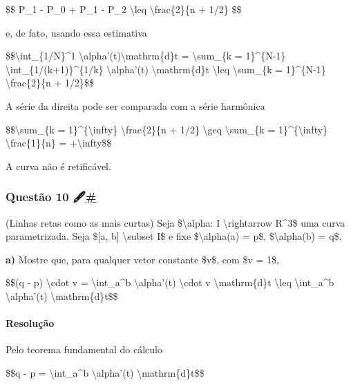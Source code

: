 \$\$ \textbar{}P\_1 - P\_0\textbar{} + \textbar{}P\_1 - P\_2\textbar{}
\textbackslash{}leq \textbackslash{}frac\{2\}\{n + 1/2\} \$\$

e, de fato, usando essa estimativa

\$\$\textbackslash{}int\_\{1/N\}\^{}1
\textbar{}\textbackslash{}alpha'(t)\textbar{}\textbackslash{}mathrm\{d\}t
= \textbackslash{}sum\_\{k = 1\}\^{}\{N-1\}
\textbackslash{}int\_\{1/(k+1)\}\^{}\{1/k\}
\textbar{}\textbackslash{}alpha'(t)\textbar{}
\textbackslash{}mathrm\{d\}t \textbackslash{}leq
\textbackslash{}sum\_\{k = 1\}\^{}\{N-1\} \textbackslash{}frac\{2\}\{n +
1/2\}\$\$

A série da direita pode ser comparada com a série harmônica

\$\$\textbackslash{}sum\_\{k = 1\}\^{}\{\textbackslash{}infty\}
\textbackslash{}frac\{2\}\{n + 1/2\} \textbackslash{}geq
\textbackslash{}sum\_\{k = 1\}\^{}\{\textbackslash{}infty\}
\textbackslash{}frac\{1\}\{n\} = +\textbackslash{}infty\$\$

A curva não é retificável.

\hypertarget{questuxe3o-10-}{%
\subsubsection{\texorpdfstring{Questão 10
🖋️\protect\hyperlink{questuxe3o-10-}{\#}}{Questão 10 🖋️\#}}\label{questuxe3o-10-}}

(Linhas retas como as mais curtas) Seja \$\textbackslash{}alpha: I
\textbackslash{}rightarrow R\^{}3\$ uma curva parametrizada. Seja
\${[}a, b{]} \textbackslash{}subset I\$ e fixe
\$\textbackslash{}alpha(a) = p\$, \$\textbackslash{}alpha(b) = q\$.

\textbf{a)} Mostre que, para qualquer vetor constante \$v\$, com
\$\textbar{}v\textbar{} = 1\$,

\$\$(q - p) \textbackslash{}cdot v = \textbackslash{}int\_a\^{}b
\textbackslash{}alpha'(t) \textbackslash{}cdot v
\textbackslash{}mathrm\{d\}t \textbackslash{}leq
\textbackslash{}int\_a\^{}b
\textbar{}\textbackslash{}alpha'(t)\textbar{}
\textbackslash{}mathrm\{d\}t\$\$

\hypertarget{resoluuxe7uxe3o-2}{%
\paragraph{Resolução}\label{resoluuxe7uxe3o-2}}

Pelo teorema fundamental do cálculo

\$\$q - p = \textbackslash{}int\_a\^{}b \textbackslash{}alpha'(t)
\textbackslash{}mathrm\{d\}t\$\$

